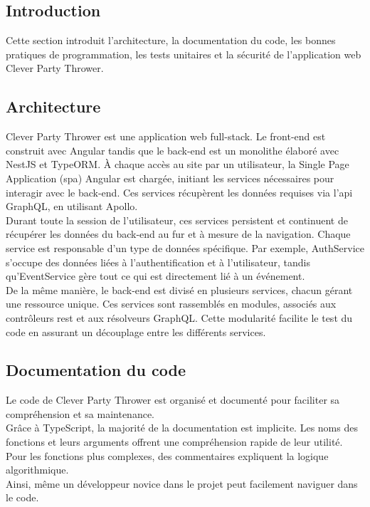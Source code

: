 \subsection{Introduction}\label{subsec:introduction}
Cette section introduit l'architecture, la documentation du code, les bonnes pratiques de programmation, les tests unitaires et la sécurité de l'application web Clever Party Thrower.

\subsection{Architecture}\label{subsec:architecture}
Clever Party Thrower est une application web full-stack.
Le front-end est construit avec Angular tandis que le back-end est un monolithe élaboré avec NestJS et TypeORM. À chaque accès au site par un utilisateur,
la Single Page Application (\Gls{spa}) Angular est chargée, initiant les services nécessaires pour interagir avec le back-end.
Ces services récupèrent les données requises via l'\Gls{api} GraphQL, en utilisant Apollo.\\

Durant toute la session de l'utilisateur, ces services persistent et continuent de récupérer les données du back-end au fur et à mesure de la navigation.
Chaque service est responsable d'un type de données spécifique.
Par exemple, AuthService s'occupe des données liées à l'authentification et à l'utilisateur, tandis qu'EventService gère tout ce qui est directement lié à un événement.\\

De la même manière, le back-end est divisé en plusieurs services, chacun gérant une ressource unique.
Ces services sont rassemblés en modules, associés aux contrôleurs \Gls{rest} et aux résolveurs GraphQL. Cette modularité facilite le test du code en assurant un découplage
entre les différents services.\\

\subsection{Documentation du code}\label{subsec:documentation-du-code}
Le code de Clever Party Thrower est organisé et documenté pour faciliter sa compréhension et sa maintenance.\\
Grâce à TypeScript, la majorité de la documentation est implicite.
Les noms des fonctions et leurs arguments offrent une compréhension rapide de leur utilité.
Pour les fonctions plus complexes, des commentaires expliquent la logique algorithmique.\\
Ainsi, même un développeur novice dans le projet peut facilement naviguer dans le code.

